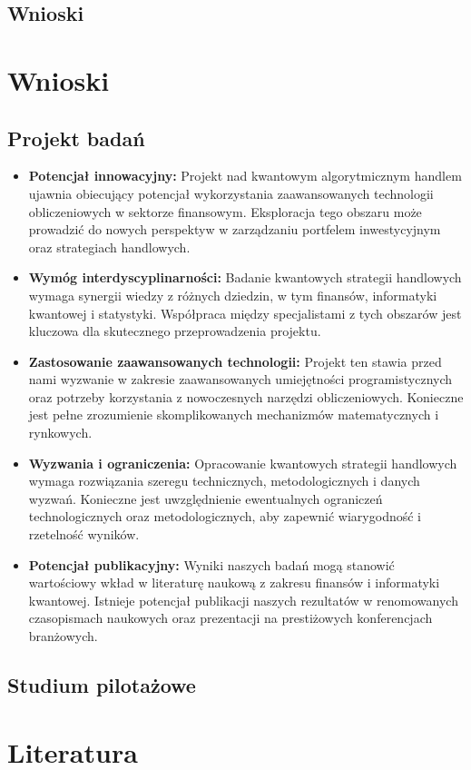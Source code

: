 \documentclass[polish,envcountsect,10pt]{article}
\begin{document}
\subsection{Wnioski}


\section{Wnioski}

\subsection{Projekt badań}

\begin{itemize}
    \item \textbf{Potencjał innowacyjny:} Projekt nad kwantowym algorytmicznym handlem ujawnia obiecujący potencjał wykorzystania zaawansowanych technologii obliczeniowych w sektorze finansowym. Eksploracja tego obszaru może prowadzić do nowych perspektyw w zarządzaniu portfelem inwestycyjnym oraz strategiach handlowych.
    
    \item \textbf{Wymóg interdyscyplinarności:} Badanie kwantowych strategii handlowych wymaga synergii wiedzy z różnych dziedzin, w tym finansów, informatyki kwantowej i statystyki. Współpraca między specjalistami z tych obszarów jest kluczowa dla skutecznego przeprowadzenia projektu.
    
    \item \textbf{Zastosowanie zaawansowanych technologii:} Projekt ten stawia przed nami wyzwanie w zakresie zaawansowanych umiejętności programistycznych oraz potrzeby korzystania z nowoczesnych narzędzi obliczeniowych. Konieczne jest pełne zrozumienie skomplikowanych mechanizmów matematycznych i rynkowych.
    
    \item \textbf{Wyzwania i ograniczenia:} Opracowanie kwantowych strategii handlowych wymaga rozwiązania szeregu technicznych, metodologicznych i danych wyzwań. Konieczne jest uwzględnienie ewentualnych ograniczeń technologicznych oraz metodologicznych, aby zapewnić wiarygodność i rzetelność wyników.
    
    \item \textbf{Potencjał publikacyjny:} Wyniki naszych badań mogą stanowić wartościowy wkład w literaturę naukową z zakresu finansów i informatyki kwantowej. Istnieje potencjał publikacji naszych rezultatów w renomowanych czasopismach naukowych oraz prezentacji na prestiżowych konferencjach branżowych.
\end{itemize}

\subsection{Studium pilotażowe}


\section{Literatura}
\end{document}
